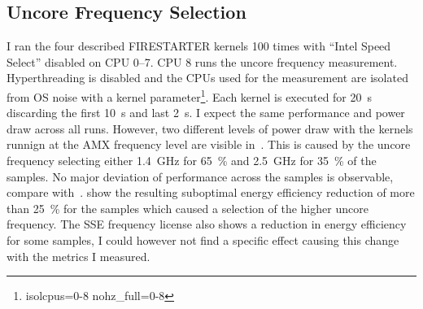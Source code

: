 \subsection{Uncore Frequency Selection}
\label{sec:avx-anomalies-uncore-freqency}

I ran the four described FIRESTARTER kernels \SI{100}{} times with ``Intel Speed Select'' disabled on CPU 0--7.
CPU 8 runs the uncore frequency measurement.
Hyperthreading is disabled and the CPUs used for the measurement are isolated from OS noise with a kernel parameter\footnote{isolcpus=0-8 nohz\_full=0-8}.
Each kernel is executed for \SI{20}{\s} discarding the first \SI{10}{\s} and last \SI{2}{\s}.
I expect the same performance and power draw across all runs.
However, two different levels of power draw with the kernels runnign at the AMX frequency level are visible in~.
This is caused by the uncore frequency selecting either \SI{1.4}{\GHz} for \SI{65}{\percent} and \SI{2.5}{\GHz} for \SI{35}{\percent} of the samples.
No major deviation of performance across the samples is observable, compare with~.
 show the resulting suboptimal energy efficiency reduction of more than \SI{25}{\percent} for the samples which caused a selection of the higher uncore frequency.
The SSE frequency license also shows a reduction in energy efficiency for some samples, I could however not find a specific effect causing this change with the metrics I measured.

